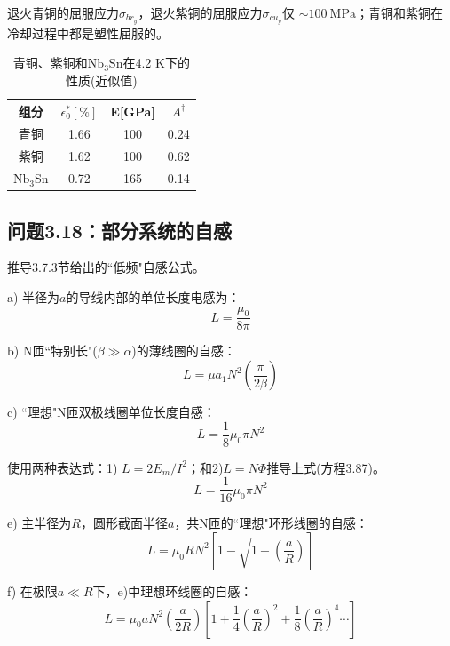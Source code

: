 退火青铜的屈服应力$\sigma_{br_y}$，退火紫铜的屈服应力$\sigma_{cu_y}$仅
$\sim 100\ \mathrm{MPa}$；青铜和紫铜在冷却过程中都是塑性屈服的。

\begin{table}[htbp]\small
\centering
\caption{青铜、紫铜和$\mathrm{Nb_3Sn}$在4.2 K下的性质(近似值)}
	\begin{tabular}{|c|c|c|c|}
		\hline
		组分& $\epsilon_{0}^{*}[\%]$    & E{[}GPa{]} & $A^\dagger$    \\ \hline\hline
		青铜     & 1.66 & 100        & 0.24 \\ \hline
		紫铜       & 1.62 & 100        & 0.62 \\ \hline
		$\mathrm{Nb_3Sn}$& 0.72 & 165        & 0.14 \\ \hline
	\end{tabular}
\end{table}


\subsection{问题3.18：部分系统的自感}
推导3.7.3节给出的``低频"自感公式。

a) 半径为$a$的导线内部的单位长度电感为：
 \begin{equation*}%
L=\frac{\mu_0}{8\pi} \tag{3.83}
\end{equation*}

b) N匝``特别长"($\beta\gg \alpha$)的薄线圈的自感：
 \begin{equation*}%
L=\mu a_1N^2\left(\frac{\pi}{2\beta}\right) \tag{3.84c}
\end{equation*}

c) ``理想"N匝双极线圈单位长度自感：
 \begin{equation*}%
L=\frac{1}{8}\mu_0\pi N^2 \tag{3.87}
\end{equation*}

使用两种表达式：1) $L= 2E_m/I^2$；和2)$ L=N\Phi$推导上式(方程3.87)。
\begin{equation*}%
L=\frac{1}{16}\mu_0\pi N^2 \tag{3.88}
\end{equation*}

e) 主半径为$R$，圆形截面半径$a$，共N匝的``理想"环形线圈的自感：
 \begin{equation*}%
L=\mu_0 R N^2\left[1-\sqrt{1-\left(\frac{a}{R}\right)}\right] \tag{3.89a}
\end{equation*}

f) 在极限$a\ll R$下，e)中理想环线圈的自感：
 \begin{equation*}%
L=\mu_0aN^2(\frac{a}{2R})[1+\frac{1}{4}(\frac{a}{R})^2+\frac{1}{8}(\frac{a}{R})^4\cdots] \tag{3.89b}
\end{equation*}

